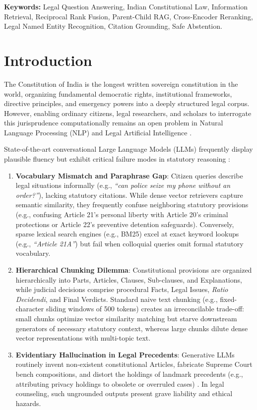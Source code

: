 \documentclass[10pt,twocolumn]{article}
\begin{document}
\noindent\textbf{Keywords:} Legal Question Answering, Indian Constitutional Law, Information Retrieval, Reciprocal Rank Fusion, Parent-Child RAG, Cross-Encoder Reranking, Legal Named Entity Recognition, Citation Grounding, Safe Abstention.

\section{Introduction}
\label{sec:intro}

The Constitution of India is the longest written sovereign constitution in the world, organizing fundamental democratic rights, institutional frameworks, directive principles, and emergency powers into a deeply structured legal corpus. However, enabling ordinary citizens, legal researchers, and scholars to interrogate this jurisprudence computationally remains an open problem in Natural Language Processing (NLP) and Legal Artificial Intelligence \cite{zhong2020nlp,paul2022pre,chalkidis2020legal}.

State-of-the-art conversational Large Language Models (LLMs) frequently display plausible fluency but exhibit critical failure modes in statutory reasoning \cite{katz2024gpt,henderson2023foundation}:
\begin{enumerate}[leftmargin=*]
    \item \textbf{Vocabulary Mismatch and Paraphrase Gap}: Citizen queries describe legal situations informally (e.g., \textit{``can police seize my phone without an order?''}), lacking statutory citations. While dense vector retrievers capture semantic similarity, they frequently confuse neighboring statutory provisions (e.g., confusing Article 21's personal liberty with Article 20's criminal protections or Article 22's preventive detention safeguards). Conversely, sparse lexical search engines (e.g., BM25) excel at exact keyword lookups (e.g., \textit{``Article 21A''}) but fail when colloquial queries omit formal statutory vocabulary.
    \item \textbf{Hierarchical Chunking Dilemma}: Constitutional provisions are organized hierarchically into Parts, Articles, Clauses, Sub-clauses, and Explanations, while judicial decisions comprise procedural Facts, Legal Issues, \textit{Ratio Decidendi}, and Final Verdicts. Standard naive text chunking (e.g., fixed-character sliding windows of 500 tokens) creates an irreconcilable trade-off: small chunks optimize vector similarity matching but starve downstream generators of necessary statutory context, whereas large chunks dilute dense vector representations with multi-topic text.
    \item \textbf{Evidentiary Hallucination in Legal Precedents}: Generative LLMs routinely invent non-existent constitutional Articles, fabricate Supreme Court bench compositions, and distort the holdings of landmark precedents (e.g., attributing privacy holdings to obsolete or overruled cases) \cite{ji2023survey}. In legal counseling, such ungrounded outputs present grave liability and ethical hazards.
\end{enumerate}
\end{document}
